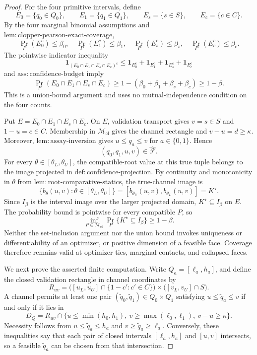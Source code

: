 \documentclass{article}
\begin{document}
\begin{proof}
For the four primitive intervals, define
\[
E_0=\{q_0\in Q_0\},\qquad
E_1=\{q_1\in Q_1\},\qquad
E_s=\{s\in S\},\qquad
E_c=\{c\in C\}.
\]
By the four marginal binomial assumptions and \(\mathrm{lem:clopper\text{-}pearson\text{-}exact\text{-}coverage}\),
\[
\Pr_P(E_0^c)\leq\beta_0,
\quad
\Pr_P(E_1^c)\leq\beta_1,
\quad
\Pr_P(E_s^c)\leq\beta_s,
\quad
\Pr_P(E_c^c)\leq\beta_c.
\]
The pointwise indicator inequality
\[
\mathbf 1_{(E_0\cap E_1\cap E_s\cap E_c)^c}
\leq
\mathbf 1_{E_0^c}+\mathbf 1_{E_1^c}
+\mathbf 1_{E_s^c}+\mathbf 1_{E_c^c}
\]
and \(\mathrm{ass:confidence\text{-}budget}\) imply
\[
\Pr_P(E_0\cap E_1\cap E_s\cap E_c)
\geq1-(\beta_0+\beta_1+\beta_s+\beta_c)
\geq1-\beta.
\]
This is a union-bound argument and uses no mutual-independence condition on the four counts.

Put \(E=E_0\cap E_1\cap E_s\cap E_c\). On \(E\), validation transport gives \(v=s\in S\) and \(1-u=c\in C\). Membership in \(\mathcal M_{\mathrm{cl}}\) gives the channel rectangle and \(v-u=d\geq\kappa\). Moreover, \(\mathrm{lem:assay\text{-}inversion}\) gives \(u\leq q_a\leq v\) for \(a\in\{0,1\}\). Hence
\[
(q_0,q_1,u,v)\in\widehat{\mathcal F}.
\]
For every \(\theta\in[\theta_L,\theta_U]\), the compatible-root value at this true tuple belongs to the image projected in \(\mathrm{def:confidence\text{-}projection}\). By continuity and monotonicity in \(\theta\) from \(\mathrm{lem:root\text{-}comparative\text{-}statics}\), the true-channel image is
\[
\{b_\theta(u,v):\theta\in[\theta_L,\theta_U]\}
=[b_{\theta_U}(u,v),b_{\theta_L}(u,v)]
=K^\star.
\]
Since \(I_\beta\) is the interval image over the larger projected domain, \(K^\star\subseteq I_\beta\) on \(E\). The probability bound is pointwise for every compatible \(P\), so
\[
\inf_{P\in\mathcal M_{\mathrm{cl}}}
\Pr_P\{K^\star\subseteq I_\beta\}\geq1-\beta.
\]
Neither the set-inclusion argument nor the union bound invokes uniqueness or differentiability of an optimizer, or positive dimension of a feasible face. Coverage therefore remains valid at optimizer ties, marginal contacts, and collapsed faces.

We next prove the asserted finite computation. Write \(Q_a=[\ell_a,h_a]\), and define the closed validation rectangle in channel coordinates by
\[
R_{uv}
=\bigl([u_L,u_U]\cap\{1-c':c'\in C\}\bigr)
\times\bigl([v_L,v_U]\cap S\bigr).
\]
A channel permits at least one pair \((\widetilde q_0,\widetilde q_1)\in Q_0\times Q_1\) satisfying \(u\leq\widetilde q_a\leq v\) if and only if it lies in
\[
D_Q=R_{uv}\cap
\{u\leq\min(h_0,h_1),\ v\geq\max(\ell_0,\ell_1),\ v-u\geq\kappa\}.
\]
Necessity follows from \(u\leq\widetilde q_a\leq h_a\) and \(v\geq\widetilde q_a\geq\ell_a\). Conversely, these inequalities say that each pair of closed intervals \([\ell_a,h_a]\) and \([u,v]\) intersects, so a feasible \(\widetilde q_a\) can be chosen from that intersection.


\end{proof}
\end{document}
